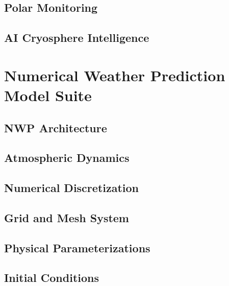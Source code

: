 \documentclass[11pt,a4paper,oneside]{report}
\begin{document}
\chapter{Polar Monitoring}



\chapter{AI Cryosphere Intelligence}



\part{Numerical Weather Prediction Model Suite}


\chapter{NWP Architecture}



\chapter{Atmospheric Dynamics}



\chapter{Numerical Discretization}



\chapter{Grid and Mesh System}



\chapter{Physical Parameterizations}



\chapter{Initial Conditions}

\end{document}
